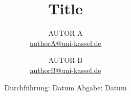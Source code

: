 

\author{%
  AUTOR A\\%
  \href{mailto:authorA@uni-kassel.de}{authorA@uni-kassel.de}%
  \and%
  AUTOR B\\%
  \href{mailto:authorB@uni-kassel.de}{authorB@uni-kassel.de}%
}
\publishers{Universität Kassel – Institut für Physik und CINSaT}

\subject{VNummer}
\title{Title}
\date{%
  Durchführung: Datum
  \hspace{3em}
  Abgabe: Datum
}



\maketitle
\thispagestyle{empty}
\tableofcontents
\newpage


\newpage

\newpage

\newpage

\newpage

\printbibliography{}

